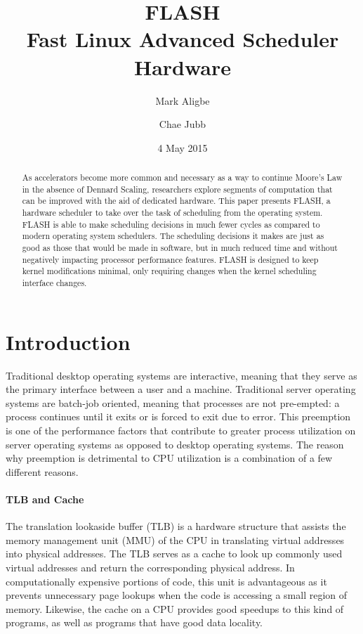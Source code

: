 \documentclass{sig-alternate-10pt}
\title{FLASH\\Fast Linux Advanced Scheduler Hardware}
\author{
	Mark Aligbe \\
	    \email{ma2799@columbia.edu}
	\and
    Chae Jubb \\
        \email{ecj2122@columbia.edu}
}
\date{4 May 2015}
\begin{document}
\maketitle

\begin{abstract}
As accelerators become more common and necessary as a way to continue Moore's Law in the absence of Dennard Scaling, researchers explore segments of computation that can be improved with the aid of dedicated hardware. This paper presents FLASH, a hardware scheduler to take over the task of scheduling from the operating system. FLASH is able to make scheduling decisions in much fewer cycles as compared to modern operating system schedulers. The scheduling decisions it makes are just as good as those that would be made in software, but in much reduced time and without negatively impacting processor performance features. FLASH is designed to keep kernel modifications minimal, only requiring changes when the kernel scheduling interface changes.

\end{abstract}

\section{Introduction}
Traditional desktop operating systems are interactive, meaning that they serve as the primary interface between a user and a machine. Traditional server operating systems are batch-job oriented, meaning that processes are not pre-empted: a process continues until it exits or is forced to exit due to error. This preemption is one of the performance factors that contribute to greater process utilization on server operating systems as opposed to desktop operating systems. The reason why preemption is detrimental to CPU utilization is a combination of a few different reasons.

\paragraph{TLB and Cache}
The translation lookaside buffer (TLB) is a hardware structure that assists the memory management unit (MMU) of the CPU in translating virtual addresses into physical addresses. The TLB serves as a cache to look up commonly used virtual addresses and return the corresponding physical address. In computationally expensive portions of code, this unit is advantageous as it prevents unnecessary page lookups when the code is accessing a small region of memory. Likewise, the cache on a CPU provides good speedups to this kind of programs, as well as programs that have good data locality.
\end{document}

